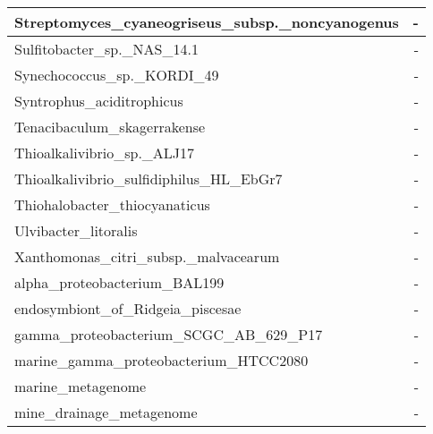 \documentclass[12pt,a4paper]{article}
\begin{document}
\begin{table}[ht]
\begin{center}
\begin{tabular}{|l*{1}{|r}|}
Streptomyces\_cyaneogriseus\_subsp.\_noncyanogenus & - \\ \hline
Sulfitobacter\_sp.\_NAS\_14.1 & - \\ \hline
Synechococcus\_sp.\_KORDI\_49 & - \\ \hline
Syntrophus\_aciditrophicus & - \\ \hline
Tenacibaculum\_skagerrakense & - \\ \hline
Thioalkalivibrio\_sp.\_ALJ17 & - \\ \hline
Thioalkalivibrio\_sulfidiphilus\_HL\_EbGr7 & - \\ \hline
Thiohalobacter\_thiocyanaticus & - \\ \hline
Ulvibacter\_litoralis & - \\ \hline
Xanthomonas\_citri\_subsp.\_malvacearum & - \\ \hline
alpha\_proteobacterium\_BAL199 & - \\ \hline
endosymbiont\_of\_Ridgeia\_piscesae & - \\ \hline
gamma\_proteobacterium\_SCGC\_AB\_629\_P17 & - \\ \hline
marine\_gamma\_proteobacterium\_HTCC2080 & - \\ \hline
marine\_metagenome & - \\ \hline
mine\_drainage\_metagenome & - \\ \hline
\end{tabular}
\end{center}
\end{table}
\end{document}
